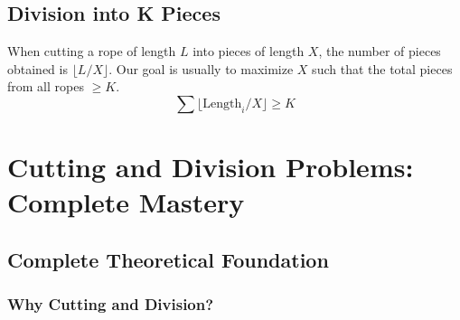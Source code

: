 \documentclass[11pt,a4paper,oneside]{book}
\begin{document}
\subsection{Division into K Pieces}
When cutting a rope of length $L$ into pieces of length $X$, the number of pieces obtained is $\lfloor L/X \rfloor$. Our goal is usually to maximize $X$ such that the total pieces from all ropes $\geq K$.
\[ \sum \lfloor \text{Length}_i / X \rfloor \geq K \]

\section{Cutting and Division Problems: Complete Mastery}

\subsection{Complete Theoretical Foundation}

\subsubsection{Why Cutting and Division?}
\end{document}
